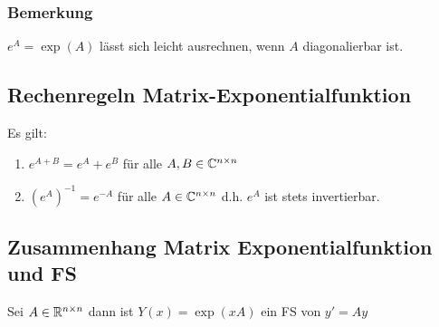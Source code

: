 \subsubsection{Bemerkung}
$e^A = \exp(A)$ lässt sich leicht ausrechnen, wenn $A$ diagonalierbar ist.

\subsection{Rechenregeln Matrix-Exponentialfunktion}
Es gilt:
\begin{enumerate}[label= (\alph*)]
	\item $e^{A+B} = e^A + e^B$ für alle $A,B \in \mathbb{C}^{n \times n}$
	\item ${(e^A)}^{-1} = e^{-A}$ für alle $A \in \mathbb{C}^{n \times n}$
		d.h. $e^A$ ist stets invertierbar. 
\end{enumerate}

\subsection{Zusammenhang Matrix Exponentialfunktion und FS}
Sei $A \in \mathbb{R}^{n \times n}$ dann ist $Y(x) = \exp{(x A)}$ ein FS von $y' = Ay$